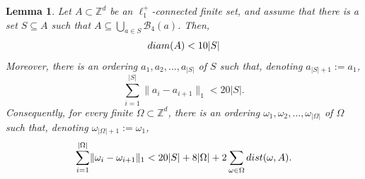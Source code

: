 \documentclass[11pt, reqno]{amsart}
\newtheorem{lemma}[theorem]{Lemma}
\numberwithin{equation}{section}
\begin{document}
\begin{lemma}\label{lem:ham}
Let $A\subset {\mathbb Z}^d$ be an $\ell_1^+$-connected finite set, and assume that there is a set $S\subseteq A$ such that $A\subseteq\bigcup_{a\in S}{\mathcal B}_4(a)$.
Then, 
\begin{equation}\label{eq:diam}
{\rm diam}(A)<10\lvert S\rvert
\end{equation}
Moreover, there is an ordering $a_1,a_2,\ldots, a_{\lvert S\rvert}$ of $S$ such that, denoting $a_{\lvert S\rvert+1}:=a_1$,
\begin{equation}\label{eq:ham}
\sum_{i=1}^{\lvert S\rvert}\lVert a_i-a_{i+1}\rVert_1<20\lvert S\rvert.
\end{equation}
Consequently, for every finite $\Omega\subset{\mathbb Z}^d$, there is an ordering $\omega_1,\omega_2,\ldots,\omega_{\lvert \Omega\rvert}$ of $\Omega$ such that, denoting $\omega_{\lvert \Omega\rvert+1}:=\omega_1$,
\begin{equation}\label{eq:ham+}
\sum_{i=1}^{\lvert \Omega\rvert}\lVert \omega_i-\omega_{i+1}\rVert_1<20\lvert S\rvert+8\lvert\Omega\rvert+2\sum_{\omega\in\Omega}{\rm dist}(\omega,A).
\end{equation}
\end{lemma}
\end{document}
